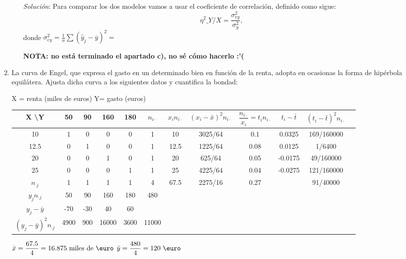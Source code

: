 \documentclass[10pt,a4paper]{article}
\begin{document}
\begin{enumerate}
\begin{enumerate}[a)]
\emph{Solución}: Para comparar los dos modelos vamos a usar el coeficiente de correlación, definido como sigue:
\[
\eta^2\_{Y/X}=\frac{\sigma_{ey}^2}{\sigma_y^2},
\]
donde \(\sigma_{ey}^2 = \frac{1}{n}\sum \left( \hat{y}_j-\overline{y}\right)^2=\)

\textbf{NOTA: no está terminado el apartado c), no sé cómo hacerlo :'(}
\end{enumerate}

\newpage
\item La curva de Engel, que expresa el gasto en un determinado bien en función de la renta, adopta en ocasionas la forma de hipérbola equilátera. Ajusta dicha curva a los siguientes datos y cuantifica la bondad:

X = renta (miles de euros) \hspace{0.5cm} Y= gasto (euros)

\vspace{0.25cm}
\setlength{\parindent}{0pt}
\begin{tabular}{|c|c|c|c|c|c|c|c|c|c|c|c|}
\hline 
X \textbackslash Y & 50 & 90 & 160 & 180 & $n_{i \cdot}$ & $x_i n_{i \cdot}$ & $(x_i - \bar{x})^2 n_{i \cdot}$ & $\dfrac{n_{i \cdot}}{x_i} = t_i n_{i \cdot}$ & $t_{i} - \bar{t}$ & $(t_{i} - \bar{t})^2 n_{i \cdot}$ \\ 
\hline 
10 & 1 & 0 & 0 & 0 & 1 & 10 & 3025/64 & 0.1 & 0.0325 & 169/160000 \\ 
\hline 
12.5 & 0 & 1 & 0 & 0 & 1 & 12.5 & 1225/64 & 0.08 & 0.0125 & 1/6400 \\ 
\hline 
20 & 0 & 0 & 1 & 0 & 1 & 20 & 625/64 & 0.05 & -0.0175 & 49/160000 \\ 
\hline 
25 & 0 & 0 & 0 & 1 & 1 & 25 & 4225/64 & 0.04 & -0.0275 & 121/160000 \\ 
\hline 
$n_{\cdot j}$ & 1 & 1 & 1 & 1 & 4 & 67.5 & 2275/16 & 0.27 &   & 91/40000 \\ 
\hline 
$y_{j}n_{\cdot j}$ & 50 & 90 & 160 & 180 & 480 &  &  &   &   &   \\ 
\hline 
$y_j - \bar{y}$ & -70 & -30 & 40 & 60 &   &   &   &  &   &   \\ 
\hline 
$(y_j - \bar{y})^2 n_{\cdot j}$ & 4900 & 900 & 16000 & 3600 & 11000 &  &   &   &   &   \\ 
\hline 
\end{tabular} 

\vspace{0.25cm}
$\bar{x} = \dfrac{67.5}{4} = 16.875 \textrm{ miles de \euro}$ \hspace{2.5cm} $\bar{y} = \dfrac{480}{4} = 120 \textrm{ \euro}$


\end{enumerate}
\end{document}
